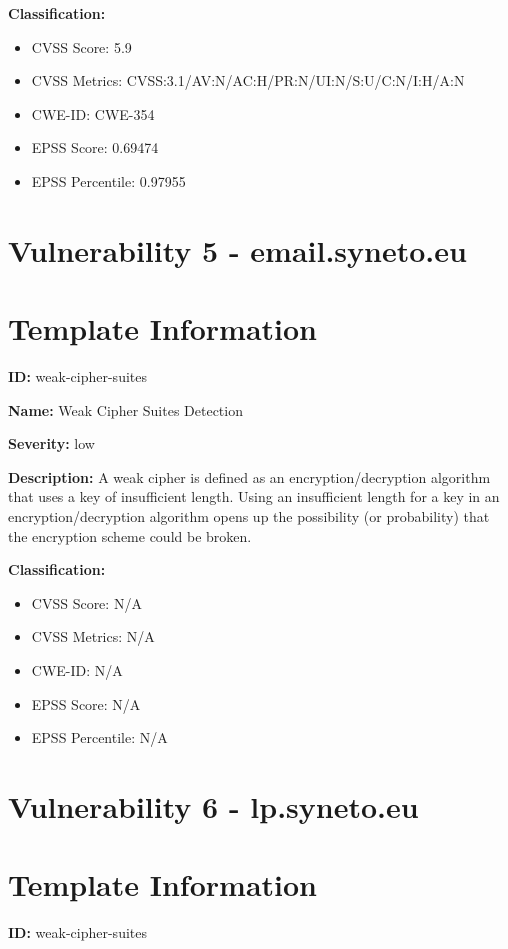 \textbf{Classification:}
\begin{itemize}
\item CVSS Score: 5.9
\item CVSS Metrics: CVSS:3.1/AV:N/AC:H/PR:N/UI:N/S:U/C:N/I:H/A:N
\item CWE-ID: CWE-354
\item EPSS Score: 0.69474
\item EPSS Percentile: 0.97955
\end{itemize}



\section*{Vulnerability 5 - email.syneto.eu}

\section*{Template Information}
\textbf{ID:} weak-cipher-suites

\textbf{Name:} Weak Cipher Suites Detection

\textbf{Severity:} low

\textbf{Description:} A weak cipher is defined as an encryption/decryption algorithm that uses a key of insufficient length. Using an insufficient length for a key in an encryption/decryption algorithm opens up the possibility (or probability) that the encryption scheme could be broken.

\textbf{Classification:}
\begin{itemize}
\item CVSS Score: N/A
\item CVSS Metrics: N/A
\item CWE-ID: N/A
\item EPSS Score: N/A
\item EPSS Percentile: N/A
\end{itemize}



\section*{Vulnerability 6 - lp.syneto.eu}

\section*{Template Information}
\textbf{ID:} weak-cipher-suites

